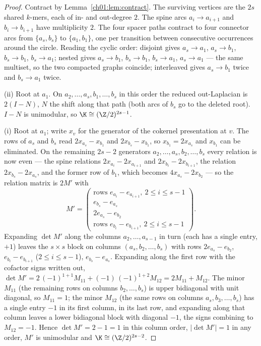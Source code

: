 \begin{proof}
Contract by Lemma~\ref{ch01:lem:contract}. The surviving vertices are the $2s$ shared $k$-mers,
each of in- and out-degree $2$. The spine arcs $a_i\to a_{i+1}$ and $b_i\to b_{i+1}$ have
multiplicity $2$. The four spacer paths contract to four connector arcs from
$\{a_s,b_s\}$ to $\{a_1,b_1\}$, one per transition between consecutive occurrences around
the circle. Reading the cyclic order: disjoint gives $a_s\!\to\!a_1$, $a_s\!\to\!b_1$,
$b_s\!\to\!b_1$, $b_s\!\to\!a_1$; nested gives $a_s\!\to\!b_1$, $b_s\!\to\!b_1$,
$b_s\!\to\!a_1$, $a_s\!\to\!a_1$ --- the same multiset, so the two compacted graphs
coincide; interleaved gives $a_s\!\to\!b_1$ twice and $b_s\!\to\!a_1$ twice.

(ii) Root at $a_1$. On $a_2,\dots,a_s,b_1,\dots,b_s$ in this order the reduced out-Laplacian
is $2(I-N)$, $N$ the shift along that path (both arcs of $b_s$ go to the deleted root).
$I-N$ is unimodular, so $\K\cong(\Z/2)^{2s-1}$.

(i) Root at $a_1$; write $x_v$ for the generator of the cokernel presentation at $v$. The
rows of $a_s$ and $b_s$ read $2x_{a_s}-x_{b_1}$ and $2x_{b_s}-x_{b_1}$, so $x_{b_1}=2x_{a_s}$
and $x_{b_1}$ can be eliminated. On the remaining $2s-2$ generators
$a_2,\dots,a_s,b_2,\dots,b_s$ every relation is now even --- the spine relations
$2x_{a_i}-2x_{a_{i+1}}$ and $2x_{b_i}-2x_{b_{i+1}}$, the relation $2x_{b_s}-2x_{a_s}$, and the
former row of $b_1$, which becomes $4x_{a_s}-2x_{b_2}$ --- so the relation matrix is $2M'$
with
\[
M'=\begin{pmatrix}
\text{rows } e_{a_i}-e_{a_{i+1}},\ 2\le i\le s-1\\
e_{b_s}-e_{a_s}\\
2e_{a_s}-e_{b_2}\\
\text{rows } e_{b_i}-e_{b_{i+1}},\ 2\le i\le s-1
\end{pmatrix}.
\]
Expanding $\det M'$ along the columns $a_2,\dots,a_{s-1}$ in turn (each has a single entry,
$+1$) leaves the $s\times s$ block on columns $(a_s,b_2,\dots,b_s)$ with rows
$2e_{a_s}-e_{b_2}$, $e_{b_i}-e_{b_{i+1}}$ ($2\le i\le s-1$), $e_{b_s}-e_{a_s}$.
Expanding along the first row with the cofactor signs written out,
$\det M'=2\,(-1)^{1+1}M_{11}+(-1)\,(-1)^{1+2}M_{12}=2M_{11}+M_{12}$. The minor $M_{11}$ (the
remaining rows on columns $b_2,\dots,b_s$) is upper bidiagonal with unit diagonal, so
$M_{11}=1$; the minor $M_{12}$ (the same rows on columns $a_s,b_3,\dots,b_s$) has a single
entry $-1$ in its first column, in its last row, and expanding along that column leaves a
lower bidiagonal block with diagonal $-1$, the signs combining to $M_{12}=-1$. Hence
$\det M'=2-1=1$ in this column order, $|\det M'|=1$ in any order, $M'$ is unimodular and
$\K\cong(\Z/2)^{2s-2}$.
\end{proof}

